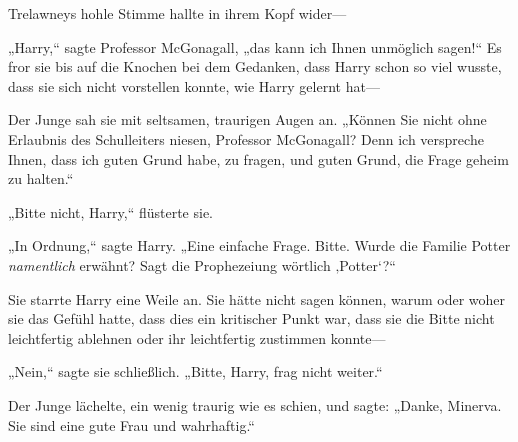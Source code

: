Trelawneys hohle Stimme hallte in ihrem Kopf wider—


„Harry,“ sagte Professor McGonagall, „das kann ich Ihnen unmöglich sagen!“ Es fror sie bis auf die Knochen bei dem Gedanken, dass Harry schon so viel wusste, dass sie sich nicht vorstellen konnte, wie Harry gelernt hat—

Der Junge sah sie mit seltsamen, traurigen Augen an. „Können Sie nicht ohne Erlaubnis des Schulleiters niesen, Professor McGonagall? Denn ich verspreche Ihnen, dass ich guten Grund habe, zu fragen, und guten Grund, die Frage geheim zu halten.“

„Bitte nicht, Harry,“ flüsterte sie.

„In Ordnung,“ sagte Harry. „Eine einfache Frage. Bitte. Wurde die Familie Potter \emph{namentlich} erwähnt? Sagt die Prophezeiung wörtlich ‚Potter‘?“

Sie starrte Harry eine Weile an. Sie hätte nicht sagen können, warum oder woher sie das Gefühl hatte, dass dies ein kritischer Punkt war, dass sie die Bitte nicht leichtfertig ablehnen oder ihr leichtfertig zustimmen konnte—

„Nein,“ sagte sie schließlich. „Bitte, Harry, frag nicht weiter.“

Der Junge lächelte, ein wenig traurig wie es schien, und sagte: „Danke, Minerva. Sie sind eine gute Frau und wahrhaftig.“

